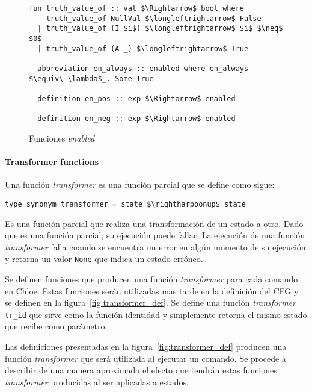 \begin{figure}
  \begin{lstlisting}[frame=single, mathescape=true]
  fun truth_value_of :: val $\Rightarrow$ bool where
    truth_value_of NullVal $\longleftrightarrow$ False
  | truth_value_of (I $i$) $\longleftrightarrow$ $i$ $\neq$ $0$
  | truth_value_of (A _) $\longleftrightarrow$ True

  abbreviation en_always :: enabled where en_always $\equiv\ \lambda$_. Some True

  definition en_pos :: exp $\Rightarrow$ enabled

  definition en_neg :: exp $\Rightarrow$ enabled
  \end{lstlisting}

  \caption{Funciones \textit{enabled}}
  \label{fig:enabled_def}
\end{figure}


\paragraph*{Transformer functions}\label{paragraph:transformer}

Una función \textit{transformer} es una función parcial que se define como sigue:

\begin{lstlisting}[mathescape=true, frame=single]
type_synonym transformer = state $\rightharpoonup$ state
\end{lstlisting}

Es una función parcial que realiza una transformación de un estado a otro.
Dado que es una función parcial, su ejecución puede fallar.
La ejecución de una función \textit{transformer} falla cuando se encuentra un error en algún momento de su ejecución y retorna un valor \verb|None| que indica un estado erróneo.

Se definen funciones que producen una función \textit{transformer} para cada comando en Chloe.
Estas funciones serán utilizadas mas tarde en la definición del CFG y se definen en la figura~\ref{fig:transformer_def}.
Se define una función \textit{transformer} \verb|tr_id| que sirve como la función identidad y simplemente retorna el mismo estado que recibe como parámetro.

Las definiciones presentadas en la figura~\ref{fig:transformer_def} producen una función \textit{transformer} que será utilizada al ejecutar un comando.
Se procede a describir de una manera aproximada el efecto que tendrán estas funciones \textit{transformer} producidas al ser aplicadas a estados.

